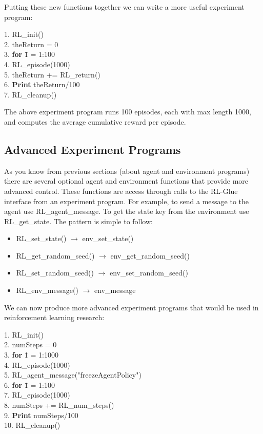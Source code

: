 \documentclass[11pt]{article}
\begin{document}
Putting these new functions together we can write a more useful experiment program:
\begin{tabbing}
1. RL\_init()\\
2. theReturn = 0\\
3. {\bf for} \= 1 = 1:100\\
4. \> RL\_episode(1000)\\
5. \> theReturn += RL\_return()\\
6.  {\bf Print} theReturn/100\\
7. RL\_cleanup()
\end{tabbing}
The above experiment program runs 100 episodes, each with max length 1000, and computes the average cumulative reward per episode.
\subsection{Advanced Experiment Programs}
\label{expp2}


As you know from previous sections (about agent and environment programs) there are several optional agent and environment functions that provide more advanced control. These functions are access through calls to the RL-Glue interface from an experiment program. For example, to send a message to the agent use RL\_agent\_message. To get the state key from the environment use RL\_get\_state. The pattern is simple to follow:
\begin{itemize}
\item RL\_set\_state() $\rightarrow$ env\_set\_state()
\item RL\_get\_random\_seed() $\rightarrow$ env\_get\_random\_seed()
\item RL\_set\_random\_seed() $\rightarrow$ env\_set\_random\_seed()
\item RL\_env\_message() $\rightarrow$ env\_message

\end{itemize}
We can now produce more advanced experiment programs that would be used in reinforcement learning research:
\begin{tabbing}
1. RL\_init()\\
2. numSteps = 0\\
3. {\bf for} \= 1 = 1:1000\\
4. \> RL\_episode(1000)\\
5. RL\_agent\_message("freezeAgentPolicy")\\
6. {\bf for} \= 1 = 1:100\\
7. \> RL\_episode(1000)\\
8. \> numSteps += RL\_num\_steps()\\
9.  {\bf Print} numSteps/100\\
10. RL\_cleanup()
\end{tabbing}
\end{document}
